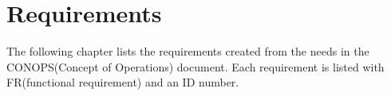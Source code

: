 \chapter{Requirements}
The following chapter lists the requirements created from the needs in the CONOPS(Concept of Operations) document. Each requirement is listed with FR(functional requirement) and an ID number. 













